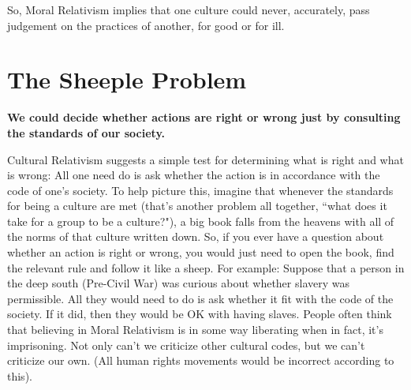 So, Moral Relativism implies that one culture could never, accurately, pass judgement on the practices of another, for good or for ill.

\section{The Sheeple Problem}

\begin{center}
\textbf{We could decide whether actions are right or wrong just by consulting the standards of our society.}
\end{center}

Cultural Relativism suggests a simple test for determining what is right and what is wrong: All one need do is ask whether the action is in accordance with the code of one's society. To help picture this, imagine that whenever the standards for being a culture are met (that's another problem all together, ``what does it take for a group to be a culture?"), a big book falls from the heavens with all of the norms of that culture written down. So, if you ever have a question about whether an action is right or wrong, you would just need to open the book, find the relevant rule and follow it like a sheep.  For example:  Suppose that a person in the deep south (Pre-Civil War) was curious about whether slavery was permissible. All they would need to do is ask whether it fit with the code of the society. If it did, then they would be OK with having slaves. People often think that believing in Moral Relativism is in some way liberating when in fact, it's imprisoning.  Not only can’t we criticize other cultural codes, but we can’t criticize our own. (All human rights movements would be incorrect according to this).

